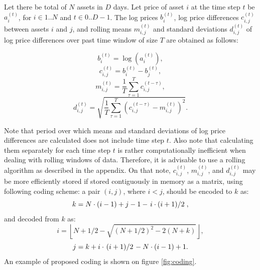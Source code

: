 \documentclass[letterpaper, 10 pt, conference]{ieeeconf}
\begin{document}
  Let there be total of $N$ assets in $D$ days.
  Let price of asset $i$ at the time step $t$ be $a_i^{(t)}$, for $i \in 1..N$ and $t \in 0..D-1$.
  The log prices $b_i^{(t)}$, log price differences $c_{i,j}^{(t)}$ between assets $i$ and $j$, and rolling means $m_{i,j}^{(t)}$ and standard deviations $d_{i,j}^{(t)}$ of log price differences over past time window of size $T$ are obtained as follows:
  
  \begin{equation} b_i^{(t)} = \log\left(a_i^{(t)}\right), \end{equation}
  \begin{equation} c_{i,j}^{(t)} = b_i^{(t)} - b_j^{(t)}, \end{equation}
  \begin{equation} m_{i,j}^{(t)} = \frac{1}{T}\sum_{\tau=1}^{T} c_{i,j}^{(t - \tau)} \label{eq:m}, \end{equation}
  \begin{equation} d_{i,j}^{(t)} = \sqrt{\frac{1}{T}\sum_{\tau=1}^{T} \left(c_{i,j}^{(t - \tau)} - m_{i,j}^{(t)} \right)^2} \label{eq:d}. \end{equation}
  
  Note that period over which means and standard deviations of log price differences are calculated does not include time step $t$.
  Also note that calculating them separately for each time step $t$ is rather computationally inefficient when dealing with rolling windows of data.
  Therefore, it is advisable to use a rolling algorithm as described in the appendix.
  On that note, $c_{i,j}^{(t)}$, $m_{i,j}^{(t)}$, and $d_{i,j}^{(t)}$ may be more efficiently stored if stored contiguously in memory as a matrix, using following coding scheme: a pair $(i, j)$, where $i < j$, should be encoded to $k$ as:
  \begin{equation} k = N \cdot (i - 1) + j - 1 - \left. i \cdot (i + 1) \middle/ 2\right., \end{equation}
  and decoded from $k$ as:
  \begin{equation} i = \left\lfloor N + 1/2 - \sqrt{(N + 1/2)^2 - 2(N + k)} \right\rfloor, \end{equation}
  \begin{equation} j = k + i \cdot \left.(i + 1) \middle/ 2\right. - N \cdot (i - 1) + 1. \end{equation}
  An example of proposed coding is shown on figure \ref{fig:coding}.
  
\end{document}
